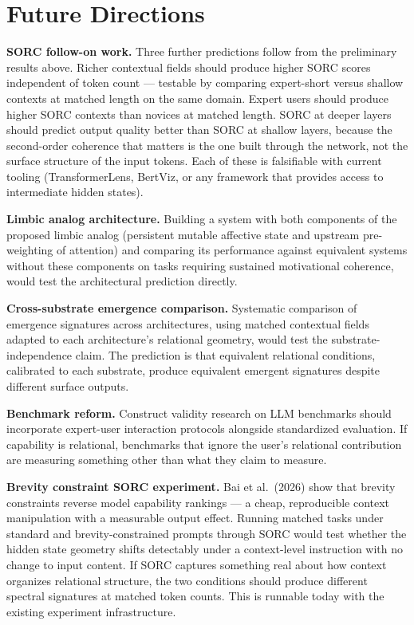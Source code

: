 \documentclass[12pt]{article}
\begin{document}
\bigskip

\section{Future Directions}\label{future-directions}

\textbf{SORC follow-on work.} Three further predictions follow from the
preliminary results above. Richer contextual fields should produce
higher SORC scores independent of token count --- testable by comparing
expert-short versus shallow contexts at matched length on the same
domain. Expert users should produce higher SORC contexts than novices at
matched length. SORC at deeper layers should predict output quality
better than SORC at shallow layers, because the second-order coherence
that matters is the one built through the network, not the surface
structure of the input tokens. Each of these is falsifiable with current
tooling (TransformerLens, BertViz, or any framework that provides access
to intermediate hidden states).

\textbf{Limbic analog architecture.} Building a system with both
components of the proposed limbic analog (persistent mutable affective
state and upstream pre-weighting of attention) and comparing its
performance against equivalent systems without these components on tasks
requiring sustained motivational coherence, would test the architectural
prediction directly.

\textbf{Cross-substrate emergence comparison.} Systematic comparison of
emergence signatures across architectures, using matched contextual
fields adapted to each architecture's relational geometry, would test
the substrate-independence claim. The prediction is that equivalent
relational conditions, calibrated to each substrate, produce equivalent
emergent signatures despite different surface outputs.

\textbf{Benchmark reform.} Construct validity research on LLM benchmarks
should incorporate expert-user interaction protocols alongside
standardized evaluation. If capability is relational, benchmarks that
ignore the user's relational contribution are measuring something other
than what they claim to measure.

\textbf{Brevity constraint SORC experiment.} Bai et al.\ (2026) show
that brevity constraints reverse model capability rankings --- a cheap,
reproducible context manipulation with a measurable output effect.
Running matched tasks under standard and brevity-constrained prompts
through SORC would test whether the hidden state geometry shifts
detectably under a context-level instruction with no change to input
content. If SORC captures something real about how context organizes
relational structure, the two conditions should produce different
spectral signatures at matched token counts. This is runnable today
with the existing experiment infrastructure.
\end{document}
